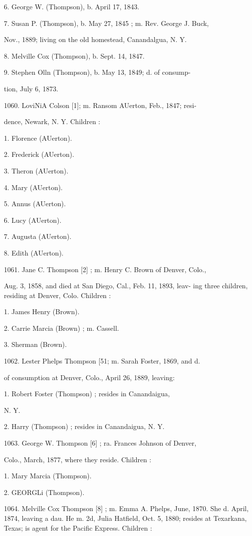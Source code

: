 6. George W. (Thompson), b. April 17, 1843. 

7. Susan P. (Thompson), b. May 27, 1845 ; m. Rev. George J. Buck, 

Nov., 1889; living on the old homestead, Canandalgua, N. Y. 

8. Melville Cox (Thompson), b. Sept. 14, 1847. 

9. Stephen Olln (Thompson), b. May 13, 1849; d. of consump- 

tion, July 6, 1873. 

1060. LoviNiA Colson [1]; m. Ransom AUerton, Feb., 1847; resi- 

dence, Newark, N. Y. Children : 

1. Florence (AUerton). 

2. Frederick (AUerton). 

3. Theron (AUerton). 

4. Mary (AUerton). 

5. Annus (AUerton). 

6. Lucy (AUerton). 

7. Augusta (AUerton). 

8. Edith (AUerton). 

1061. Jane C. Thompson [2] ; m. Henry C. Brown of Denver, Colo., 

Aug. 3, 1858, and died at San Diego, Cal., Feb. 11, 1893, leav- 
ing three children, residing at Denver, Colo. Children : 

1. James Henry (Brown). 

2. Carrie Marcia (Brown) ; m. Cassell. 

3. Sherman (Brown). 

1062. Lester Phelps Thompson [51; m. Sarah Foster, 1869, and d. 

of consumption at Denver, Colo., April 26, 1889, leaving: 

1. Robert Foster (Thompson) ; resides in Canandaigua, 

N. Y. 

2. Harry (Thompson) ; resides in Canandaigua, N. Y. 

1063. George W. Thompson [6] ; ra. Frances Johnson of Denver, 

Colo., March, 1877, where they reside. Children : 

1. Mary Marcia (Thompson). 

2. GEORGLi (Thompson). 




1064. Melville Cox Thompson [8] ; m. Emma A. Phelps, June, 
1870. She d. April, 1874, leaving a dau. He m. 2d, Julia 
Hatfield, Oct. 5, 1880; resides at Texarkana, Texas; is agent 
for the Pacific Express. Children : 

